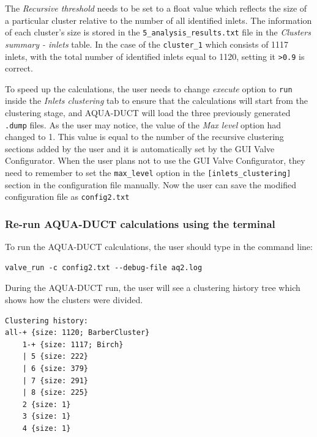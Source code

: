 \documentclass[9pt,tutorial]{livecoms}
\begin{document}
The \emph{Recursive threshold} needs to be set to a float value which reflects the size of a particular cluster relative to the number of all identified inlets. The information of each cluster's size is stored in the \texttt{5\_analysis\_results.txt} file in the \emph{Clusters summary - inlets} table. In the case of the \texttt{cluster\_1} which consists of 1117 inlets, with the total number of identified inlets equal to 1120, setting it \texttt{>0.9} is correct.

To speed up the calculations, the user needs to change \textit{execute} option to \texttt{run} inside the \textit{Inlets clustering} tab to ensure that the calculations will start from the clustering stage, and AQUA-DUCT will load the three previously generated \texttt{.dump} files. As the user may notice, the value of the \emph{Max level} option had changed to 1. This value is equal to the number of the recursive clustering sections added by the user and it is automatically set by the GUI Valve Configurator. When the user plans not to use the GUI Valve Configurator, they need to remember to set the \texttt{max\_level} option in the \texttt{[inlets\_clustering]} section in the configuration file manually. Now the user can save the modified configuration file as \texttt{config2.txt}

\subsubsection{Re-run AQUA-DUCT calculations using the terminal}
To run the AQUA-DUCT calculations, the user should type in the command line:
\begin{lstlisting}[columns=fullflexible]
valve_run -c config2.txt --debug-file aq2.log
\end{lstlisting}

During the AQUA-DUCT run, the user will see a clustering history tree which shows how the clusters were divided.
\begin{lstlisting}
Clustering history:
all-+ {size: 1120; BarberCluster}
    1-+ {size: 1117; Birch}
    | 5 {size: 222}
    | 6 {size: 379}
    | 7 {size: 291}
    | 8 {size: 225}
    2 {size: 1}
    3 {size: 1}
    4 {size: 1}
\end{lstlisting}
\end{document}
